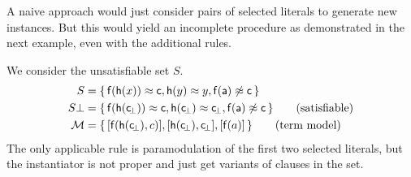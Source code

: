 A naive approach would just consider pairs of selected literals to generate new instances. But this would yield an incomplete procedure 
as demonstrated in the next example, even with the additional rules.

\newcommand{\myset}[1]{\{ \, #1 \, \}}
\newcommand{\mysub}[1]{\{ #1 \}}

\begin{example}\label{ex:naive:inst:gen:eq}
	We consider the unsatisfiable set \( S \).
	\begin{align*}
		S &= \myset{
			\mf(\mh(x)) \mEQ \mc, \mh(y)\mEQ y, \mf(\ma) \mNE \mc
		}
		\\
		S\bot &= \myset{
			\mf(\mh(\consbot)) \mEQ \mc, \mh(\consbot)\mEQ \consbot, \mf(\ma) \mNE \mc
		}\tag{satisfiable}
		\\
		\mcM &= \myset{
			[\mf(\mh(\consbot),c)], [\mh(\consbot),\consbot], [\mf(a)]
		}\tag{term model}
	\end{align*}
	The only applicable rule is paramodulation of the first two selected literals,
	but the instantiator is not proper and just get variants of clauses in the set.
\end{example}

